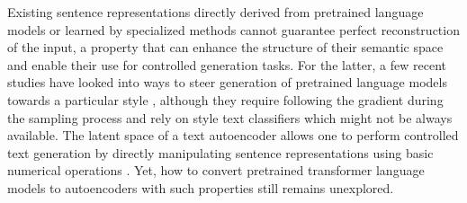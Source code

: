 Existing sentence representations directly derived from pretrained language models or learned by specialized methods cannot guarantee perfect reconstruction of the input, a property that can enhance the structure of their semantic space and enable their use for controlled generation tasks. For the latter, a few recent studies have looked into ways to steer generation of pretrained language models towards a particular style \citep{Dathathri2020Plug,krause2021gedi}, although they require following the gradient during the sampling process and rely on style text classifiers which might not be always available. 
The latent space of a text autoencoder allows one to perform controlled text generation by directly manipulating  sentence representations using basic numerical operations \cite{pmlr-v119-shen20c}. Yet, how to convert pretrained transformer language models to autoencoders with such properties still remains unexplored. 



